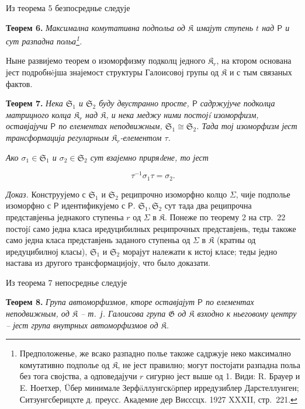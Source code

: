 \documentclass[11pt]{article}
\newcommand{\srcfn}[2]{\footnote{#2}}
\begin{document}
Из теорема 5 безпосреднье следује

\textbf{Теорем 6.} \emph{Максимална комутативна подпольа од \(\mathfrak K\) имајут ступень \(t\) над \(\mathsf P\) и сут разпадна польа\srcfn{1}{Предположенье, же всако разпадно полье такоже садржује неко максимално комутативно подполье од \(\mathfrak K\), не јест правилно; могут постојати разпадна польа без тога својства, а одповедајучи \(r\) сигурно јест выше од 1. Види: R. Брауер и E. Ноетхер, Üбер минимале Зерфäллунгскöрпер ирредузиблер Дарстеллунген; Ситзунгсберицхте д. преусс. Академие дер Висссцх. 1927 XXXII, стр.~221.}.}

Ныне развијемо теорем о изоморфизму подколц једного \(\mathfrak K_r\), на ктором основана јест подробнėјша знајемост структуры Галоисовој групы од \(\mathfrak K\) и с тым связаных фактов.

\textbf{Теорем 7.} \emph{Нека \(\mathfrak S_1\) и \(\mathfrak S_2\) буду двустранно просте, \(\mathsf P\) садржујуче подколца матрицного колца \(\mathfrak K_r\) над \(\mathfrak K\), и нека меджу ними постојí изоморфизм, оставјајучи \(\mathsf P\) по елементах неподвижным, \(\mathfrak S_1\cong\mathfrak S_2\). Тада тој изоморфизм јест трансформација регуларным \(\mathfrak K_r\)-елементом \(\tau\).}

\emph{Ако \(\sigma_1\in\mathfrak S_1\) и \(\sigma_2\in\mathfrak S_2\) сут взајемно приряđене, то јест}

\[
\tau^{-1}\sigma_1\tau=\sigma_2.
\]

\emph{Доказ.} Конструујемо с \(\mathfrak S_1\) и \(\mathfrak S_2\) реципрочно изоморфно колцо \(\Sigma\), чије подполье изоморфно с \(\mathsf P\) идентификујемо с \(\mathsf P\). \(\mathfrak S_1,\mathfrak S_2\) сут тада два реципрочна представјеньа једнакого ступеньа \(r\) од \(\Sigma\) в \(\mathfrak K\). Понеже по теорему 2 на стр.~22 постојí само једна класа иредуцибилных реципрочных представјень, теды такоже само једна класа представјень заданого ступеньа од \(\Sigma\) в \(\mathfrak K\) (кратны од иредуцибилној класы), \(\mathfrak S_1\) и \(\mathfrak S_2\) морајут належати к истој класе; теды једно настава из другого трансформацијоју, что было доказати.

Из теорема 7 непосреднье следује

\textbf{Теорем 8.} \emph{Група автоморфизмов, кторе оставјајут \(\mathsf P\) по елементах неподвижным, од \(\mathfrak K\) -- т.~ј. Галоисова група \(\mathfrak G\) од \(\mathfrak K\) взходно к ньеговому центру -- јест група внутрных автоморфизмов од \(\mathfrak K\).}
\end{document}
